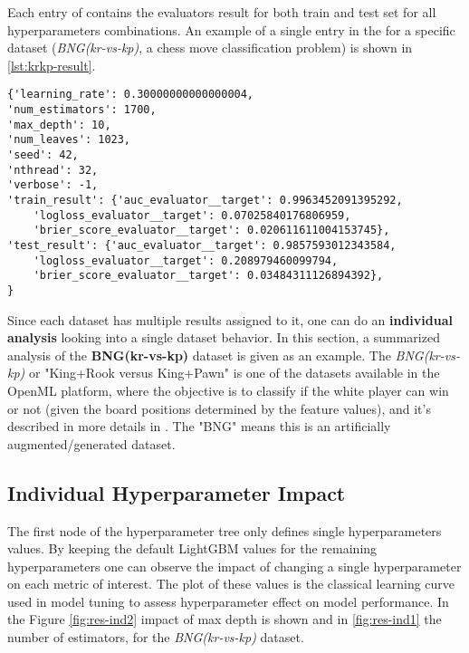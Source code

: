 Each entry of  contains the evaluators result for both train and test set for all hyperparameters combinations. An example of a single entry in the  for a specific dataset (\textit{BNG(kr-vs-kp)}, a chess move classification problem) is shown in \ref{lst:krkp-result}.

\begin{lstlisting}[caption={BNG(kr-vs-kp) experiment result for hyperparam combination (0.3, 1700, 10)}, label={lst:krkp-result}]
{'learning_rate': 0.30000000000000004,
'num_estimators': 1700,
'max_depth': 10,
'num_leaves': 1023,
'seed': 42,
'nthread': 32,
'verbose': -1,
'train_result': {'auc_evaluator__target': 0.9963452091395292,
    'logloss_evaluator__target': 0.07025840176806959,
    'brier_score_evaluator__target': 0.020611611004153745},
'test_result': {'auc_evaluator__target': 0.9857593012343584,
    'logloss_evaluator__target': 0.208979460099794,
    'brier_score_evaluator__target': 0.03484311126894392},
}  \end{lstlisting}


Since each dataset has multiple results assigned to it, one can do an \textbf{individual analysis} looking into a single dataset behavior. In this section, a summarized analysis of the \textbf{BNG(kr-vs-kp)} dataset is given as an example. The \textit{BNG(kr-vs-kp)} or "King+Rook versus King+Pawn" is one of the datasets available in the OpenML platform, where the objective is to classify if the white player can win or not (given the board positions determined by the feature values), and it's described in more details in \cite{shapiro1987structured}. The "BNG" means this is an artificially augmented/generated dataset.

\subsection{Individual Hyperparameter Impact}
\label{subsec:indv-impact}

The first node of the hyperparameter tree only defines single hyperparameters values. By keeping the default LightGBM values for the remaining hyperparameters one can observe the impact of changing a single hyperparameter on each metric of interest. The plot of these values is the classical learning curve used in model tuning to assess hyperparameter effect on model performance. In the Figure \ref{fig:res-ind2} impact of max depth is shown and in \ref{fig:res-ind1} the number of estimators, for the \textit{BNG(kr-vs-kp)} dataset.

